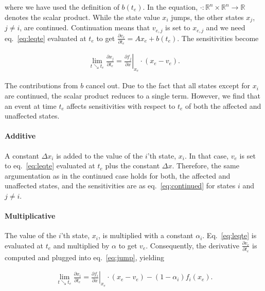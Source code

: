 \documentclass[journal, a4paper]{IEEEtran}
\begin{document}
where we have used the definition of $b(t_e)$. In the equation,
$\cdot: \mathbb R^n\times \mathbb R^n\rightarrow \mathbb R$ denotes
the scalar product. While the state value $x_i$ jumps, the other
states $x_j$, $j\neq i$, are continued. Continuation means that $v_{e,
  j}$ is set to $x_{e, j}$ and we need eq.~\eqref{eq:leqte} evaluated
at $t_e$ to get $\frac{\partial v_e}{\partial t_e} = Ax_e +
b(t_e)$. The sensitivities become

\begin{align}
    \lim_{t\searrow t_e}\frac{\partial x_j}{\partial t_e} = \left.\frac{\partial f_j}{\partial x}\right|_{x_e}\cdot (x_e - v_e).\label{eq:continued}
\end{align}

The contributions from $b$ cancel out. Due to the fact that all states
except for $x_i$ are continued, the scalar product reduces to a single
term. However, we find that an event at time $t_e$ affects
sensitivities with respect to $t_e$ of both the affected and
unaffected states.\\


\paragraph{Additive}

A constant $\Delta x_i$ is added to the value of the $i$'th state,
$x_i$. In that case, $v_e$ is set to eq.~\eqref{eq:leqte} evaluated at
$t_e$ plus the constant $\Delta x$. Therefore, the same argumentation
as in the continued case holds for both, the affected and unaffected
states, and the sensitivities are as eq.~\eqref{eq:continued} for
states $i$ and $j\neq i$. \\

\paragraph{Multiplicative}

The value of the $i$'th state, $x_i$, is multiplied with a constant
$\alpha_i$. Eq.~\eqref{eq:leqte} is evaluated at $t_e$ and multiplied
by $\alpha$ to get $v_e$. Consequently, the derivative $\frac{\partial
  v_e}{\partial t_e}$ is computed and plugged into
eq.~\eqref{eq:jump}, yielding

\begin{align}
    \lim_{t\searrow t_e}\frac{\partial x_i}{\partial t_e} = \left.\frac{\partial f_i}{\partial x}\right|_{x_e}\cdot (x_e - v_e) - (1-\alpha_i)f_i(x_e).
\end{align}
\end{document}
